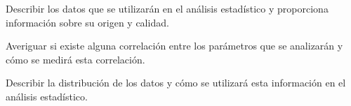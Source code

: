 Describir los datos que se utilizarán en el análisis estadístico y proporciona información sobre su origen y calidad. 

Averiguar si existe alguna correlación entre los parámetros que se analizarán y cómo se medirá esta correlación. 

Describir la distribución de los datos y cómo se utilizará esta información en el análisis estadístico.